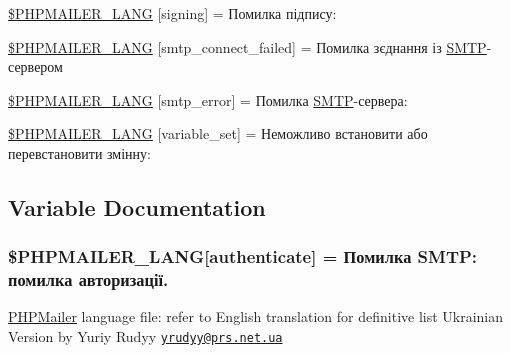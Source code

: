 \begin{DoxyCompactItemize}
\item 
\hyperlink{phpmailer_8lang-uk_8php_a68e437bdb9b968a5a67320f03d231565}{\$\+P\+H\+P\+M\+A\+I\+L\+E\+R\+\_\+\+L\+A\+NG} \mbox{[}\textquotesingle{}signing\textquotesingle{}\mbox{]} = \textquotesingle{}Помилка підпису\+: \textquotesingle{}
\item 
\hyperlink{phpmailer_8lang-uk_8php_a7b321d4ca1e9df702403ed4c61aa0980}{\$\+P\+H\+P\+M\+A\+I\+L\+E\+R\+\_\+\+L\+A\+NG} \mbox{[}\textquotesingle{}smtp\+\_\+connect\+\_\+failed\textquotesingle{}\mbox{]} = \textquotesingle{}Помилка зєднання із \hyperlink{class_s_m_t_p}{S\+M\+TP}-\/сервером\textquotesingle{}
\item 
\hyperlink{phpmailer_8lang-uk_8php_a7d9cffba1e669c845f8a4c891ee50064}{\$\+P\+H\+P\+M\+A\+I\+L\+E\+R\+\_\+\+L\+A\+NG} \mbox{[}\textquotesingle{}smtp\+\_\+error\textquotesingle{}\mbox{]} = \textquotesingle{}Помилка \hyperlink{class_s_m_t_p}{S\+M\+TP}-\/сервера\+: \textquotesingle{}
\item 
\hyperlink{phpmailer_8lang-uk_8php_af795debc7a739d038742691c358d9032}{\$\+P\+H\+P\+M\+A\+I\+L\+E\+R\+\_\+\+L\+A\+NG} \mbox{[}\textquotesingle{}variable\+\_\+set\textquotesingle{}\mbox{]} = \textquotesingle{}Неможливо встановити або перевстановити змінну\+: \textquotesingle{}
\end{DoxyCompactItemize}


\subsection{Variable Documentation}
\subsubsection[{\texorpdfstring{\$\+P\+H\+P\+M\+A\+I\+L\+E\+R\+\_\+\+L\+A\+NG}{$PHPMAILER_LANG}}]{\setlength{\rightskip}{0pt plus 5cm}\$P\+H\+P\+M\+A\+I\+L\+E\+R\+\_\+\+L\+A\+NG\mbox{[}\textquotesingle{}authenticate\textquotesingle{}\mbox{]} = \textquotesingle{}Помилка S\+M\+T\+P\+: помилка авторизації.\textquotesingle{}}\hypertarget{phpmailer_8lang-uk_8php_a2cb33073c989b85580748e331ed8b4aa}{}\label{phpmailer_8lang-uk_8php_a2cb33073c989b85580748e331ed8b4aa}
\hyperlink{class_p_h_p_mailer}{P\+H\+P\+Mailer} language file\+: refer to English translation for definitive list Ukrainian Version by Yuriy Rudyy \href{mailto:yrudyy@prs.net.ua}{\tt yrudyy@prs.\+net.\+ua} 

